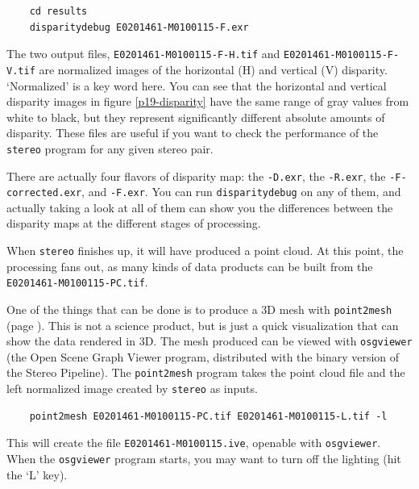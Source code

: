 \begin{verbatim}
    cd results
    disparitydebug E0201461-M0100115-F.exr
\end{verbatim}

\noindent
The two output files, \texttt{E0201461-M0100115-F-H.tif} and
\texttt{E0201461-M0100115-F-V.tif} are normalized images of the
horizontal (H) and vertical (V) disparity.  `Normalized' is a key
word here.  You can see that the horizontal and vertical disparity
images in figure \ref{p19-disparity} have the same range of gray
values from white to black, but they represent significantly different
absolute amounts of disparity.  These files are useful if you want
to check the performance of the \texttt{stereo} program for any
given stereo pair.

There are actually four flavors of disparity map: the \texttt{-D.exr},
the \texttt{-R.exr}, the \texttt{-F-corrected.exr}, and \texttt{-F.exr}.
You can run \texttt{disparitydebug} on any of them, and actually taking a
look at all of them can show you the differences between the disparity maps
at the different stages of processing.

When \texttt{stereo} finishes up, it will have produced a point cloud.
At this point, the processing fans out, as many kinds of data
products can be built from the \texttt{E0201461-M0100115-PC.tif}.

One of the things that can be done is to produce a 3D mesh with
\texttt{point2mesh} (page \pageref{point2mesh}). This is not a science
product, but is just a quick visualization that can show the data
rendered in 3D. The mesh produced can be viewed with
\texttt{osgviewer} (the Open Scene Graph Viewer program, distributed
with the binary version of the Stereo Pipeline).  The
\texttt{point2mesh} program takes the point cloud file and the left
normalized image created by \texttt{stereo} as inputs.

\begin{verbatim}
    point2mesh E0201461-M0100115-PC.tif E0201461-M0100115-L.tif -l
\end{verbatim}

\noindent
This will create the file \texttt{E0201461-M0100115.ive}, openable
with \texttt{osgviewer}. When the \texttt{osgviewer} program starts,
you may want to turn off the lighting (hit the `L' key).

